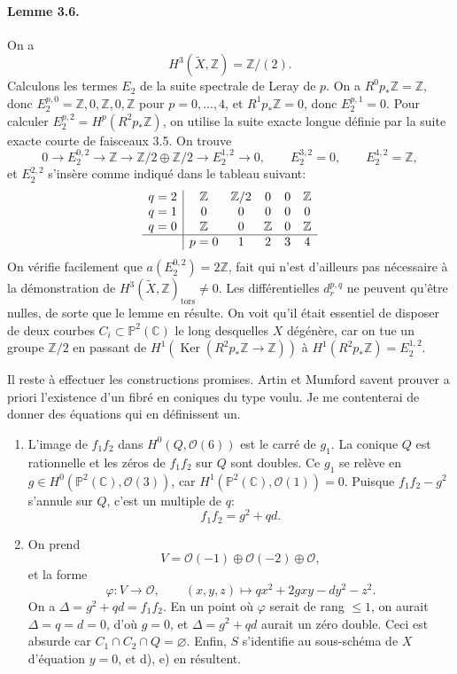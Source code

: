 \documentclass[10pt]{article}
\newcommand{\C}{\mathbb C}
\newcommand{\Pj}{\mathbb P}
\newcommand{\Z}{\mathbb Z}
\newcommand{\Ker}{\operatorname{Ker}}
\newcommand{\tors}{\operatorname{tors}}
\begin{document}
\paragraph{Lemme 3.6.} On a
\[
H^3(\widetilde X,\Z)=\Z/(2).
\]
Calculons les termes \(E_2\) de la suite spectrale de Leray de \(p\). On a \(R^0p_*\Z=\Z\), donc \(E_2^{p,0}=\Z,0,\Z,0,\Z\) pour \(p=0,\ldots,4\), et \(R^1p_*\Z=0\), donc \(E_2^{p,1}=0\). Pour calculer \(E_2^{p,2}=H^p(R^2p_*\Z)\), on utilise la suite exacte longue définie par la suite exacte courte de faisceaux 3.5. On trouve
\[
0\to E_2^{0,2}\to\Z\to\Z/2\oplus\Z/2\to E_2^{1,2}\to0,
\qquad E_2^{3,2}=0,
\qquad E_2^{4,2}=\Z,
\]
et \(E_2^{2,2}\) s'insère comme indiqué dans le tableau suivant:
\[
\begin{array}{c|ccccc}
q=2&\Z&\Z/2&0&0&\Z\\
q=1&0&0&0&0&0\\
q=0&\Z&0&\Z&0&\Z\\ \hline
&p=0&1&2&3&4
\end{array}
\]
On vérifie facilement que \(a(E_2^{0,2})=2\Z\), fait qui n'est d'ailleurs pas nécessaire à la démonstration de \(H^3(\widetilde X,\Z)_{\tors}\ne0\). Les différentielles \(d_r^{p,q}\) ne peuvent qu'être nulles, de sorte que le lemme en résulte. On voit qu'il était essentiel de disposer de deux courbes \(C_i\subset\Pj^2(\C)\) le long desquelles \(X\) dégénère, car on tue un groupe \(\Z/2\) en passant de \(H^1(\Ker(R^2p_*\Z\to\Z))\) à \(H^1(R^2p_*\Z)=E_2^{1,2}\).

Il reste à effectuer les constructions promises. Artin et Mumford savent prouver a priori l'existence d'un fibré en coniques du type voulu. Je me contenterai de donner des équations qui en définissent un.

\begin{enumerate}[label=\arabic*)]
\item L'image de \(f_1f_2\) dans \(H^0(Q,\mathcal O(6))\) est le carré de \(g_1\). La conique \(Q\) est rationnelle et les zéros de \(f_1f_2\) sur \(Q\) sont doubles. Ce \(g_1\) se relève en \(g\in H^0(\Pj^2(\C),\mathcal O(3))\), car \(H^1(\Pj^2(\C),\mathcal O(1))=0\). Puisque \(f_1f_2-g^2\) s'annule sur \(Q\), c'est un multiple de \(q\):
\[
f_1f_2=g^2+qd.
\]
\item On prend
\[
V=\mathcal O(-1)\oplus\mathcal O(-2)\oplus\mathcal O,
\]
et la forme
\[
\varphi:V\to\mathcal O,
\qquad (x,y,z)\longmapsto qx^2+2gxy-dy^2-z^2.
\]
On a \(\Delta=g^2+qd=f_1f_2\). En un point où \(\varphi\) serait de rang \(\le1\), on aurait \(\Delta=q=d=0\), d'où \(g=0\), et \(\Delta=g^2+qd\) aurait un zéro double. Ceci est absurde car \(C_1\cap C_2\cap Q=\varnothing\). Enfin, \(S\) s'identifie au sous-schéma de \(X\) d'équation \(y=0\), et d), e) en résultent.
\end{enumerate}
\end{document}
